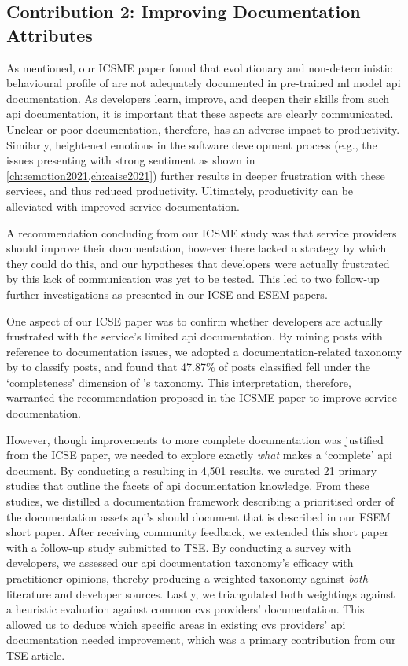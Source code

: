 \subsection{Contribution 2: Improving Documentation Attributes}

As mentioned, our ICSME paper found that evolutionary and non-deterministic behavioural profile of are not adequately documented in pre-trained \gls{ml} model \gls{api} documentation. As developers learn, improve, and deepen their skills from such \gls{api} documentation, it is important that these aspects are clearly communicated. Unclear or poor documentation, therefore, has an adverse impact to productivity. Similarly, heightened emotions in the software development process (e.g., the  issues presenting with strong sentiment as shown in \cref{ch:semotion2021,ch:caise2021}) further results in deeper frustration with these services, and thus reduced productivity. Ultimately, productivity can be alleviated with improved service documentation.

A recommendation concluding from our ICSME study was that service providers should improve their documentation, however there lacked a strategy by which they could do this, and our hypotheses that developers were actually frustrated by this lack of communication was yet to be tested. This led to two follow-up further investigations as presented in our ICSE and ESEM papers.

One aspect of our ICSE paper was to confirm whether developers are actually frustrated with the service's limited \gls{api} documentation. By mining  posts with reference to documentation issues, we adopted a \citeyear{Aghajani:2019bo} documentation-related taxonomy by \citet{Aghajani:2018et} to classify posts, and found that 47.87\% of posts classified fell under the `completeness' dimension of \citeauthor{Aghajani:2018et}'s taxonomy. This interpretation, therefore, warranted the recommendation proposed in the ICSME paper to improve service documentation. 

However, though improvements to more complete documentation was justified from the ICSE paper, we needed to explore exactly \textit{what} makes a `complete' \gls{api} document. By conducting a  resulting in 4,501 results, we curated 21 primary studies that outline the facets of \gls{api} documentation knowledge. From these studies, we distilled a documentation framework describing a prioritised order of the documentation assets \gls{api}'s should document that is described in our ESEM short paper. After receiving community feedback, we extended this short paper with a follow-up study submitted to TSE. By conducting a survey with developers, we assessed our \gls{api} documentation taxonomy's efficacy with practitioner opinions, thereby producing a weighted taxonomy against \textit{both} literature and developer sources. Lastly, we triangulated both weightings against a heuristic evaluation against common \gls{cvs} providers' documentation. This allowed us to deduce which specific areas in existing \gls{cvs} providers' \gls{api} documentation needed improvement, which was a primary contribution from our TSE article.

